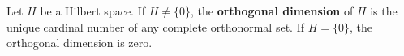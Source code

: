 Let $H$ be a Hilbert space. If $H \neq \{0\}$, the \textbf{orthogonal dimension} of $H$ is the unique cardinal number of any complete orthonormal set. If $H = \{0\}$, the orthogonal dimension is zero.
